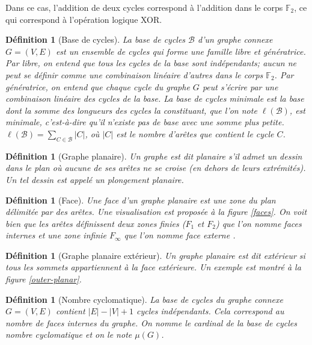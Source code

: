 \documentclass{article}
\newtheorem{definition}[theorem]{Définition}
\begin{document}
Dans ce cas, l'addition de deux cycles correspond à l'addition dans le corps $\mathbb{F}_2$, ce qui correspond à l'opération logique XOR.

\begin{definition}[Base de cycles]
La base de cycles $\mathcal{B}$ d'un graphe connexe $G=(V,E)$ est un ensemble de cycles qui forme une famille libre et génératrice. Par libre, on entend que tous les cycles de la base sont indépendants; aucun ne peut se définir comme une combinaison linéaire d'autres dans le corps $\mathbb{F}_2$. Par génératrice, on entend que chaque cycle du graphe $G$ peut s'écrire par une combinaison linéaire des cycles de la base.
La base de cycles minimale est la base dont la somme des longueurs des cycles la constituant, que l'on note $\ell(\mathcal{B})$, est minimale, c'est-à-dire qu'il n'existe pas de base avec une somme plus petite. $\ell(\mathcal{B}) = \sum\limits_{C \in \mathcal{B}} \lvert C \rvert $, où $\lvert C \rvert $ est le nombre d'arêtes que contient le cycle $C$.
\end{definition}

\begin{definition}[Graphe planaire]
    Un graphe est dit planaire s'il admet un dessin dans le plan où aucune de ses arêtes ne se croise (en dehors de leurs extrémités). Un tel dessin est appelé un plongement planaire.
\end{definition}

\begin{definition}[Face]
    Une face d'un graphe planaire est une zone du plan délimitée par des arêtes. Une visualisation est proposée à la figure \ref{faces}. On voit bien que les arêtes définissent deux zones finies ($F_1$ et $F_2$) que l'on nomme \og faces internes \fg et une zone infinie $F_\infty$ que l'on nomme \og face externe \fg.
\end{definition}

\begin{definition}[Graphe planaire extérieur]
    Un graphe planaire est dit \og extérieur \fg si tous les sommets appartiennent à la face extérieure. Un exemple est montré à la figure \ref{outer-planar}.
\end{definition}

\begin{definition}[Nombre cyclomatique]
    La base de cycles du graphe connexe $G=(V,E)$ contient $\lvert E \rvert -\lvert V \rvert +1$ cycles indépendants. Cela correspond au nombre de faces internes du graphe. On nomme le cardinal de la base de cycles nombre cyclomatique et on le note $\mu(G)$.
    \label{nb_cyclo}
\end{definition}
\end{document}
